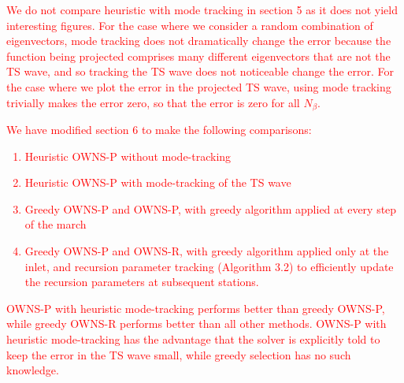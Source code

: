 \documentclass{article}
\newcommand{\response}[1]{\textcolor{red}{#1}}
\begin{document}
\begin{enumerate}
    \response{
    We do not compare heuristic with mode tracking in section 5 as it does not yield interesting figures. For the case where we consider a random combination of eigenvectors, mode tracking does not dramatically change the error because the function being projected comprises many different eigenvectors that are not the TS wave, and so tracking the TS wave does not noticeable change the error. For the case where we plot the error in the projected TS wave, using mode tracking trivially makes the error zero, so that the error is zero for all $N_\beta$.
    }
    \response{
    We have modified section 6 to make the following comparisons:
    \begin{enumerate}
        \item Heuristic OWNS-P without mode-tracking
        \item Heuristic OWNS-P with mode-tracking of the TS wave
        \item Greedy OWNS-P and OWNS-P, with greedy algorithm applied at every step of the march
        \item Greedy OWNS-P and OWNS-R, with greedy algorithm applied only at the inlet, and recursion parameter tracking (Algorithm 3.2) to efficiently update the recursion parameters at subsequent stations.
    \end{enumerate}
    OWNS-P with heuristic mode-tracking performs better than greedy OWNS-P, while greedy OWNS-R performs better than all other methods. OWNS-P with heuristic mode-tracking has the advantage that the solver is explicitly told to keep the error in the TS wave small, while greedy selection has no such knowledge.
    }


\end{enumerate}
\end{document}
